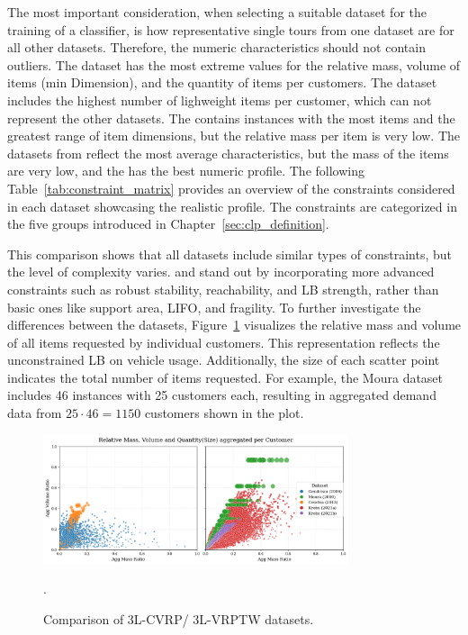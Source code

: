The most important consideration, when selecting a suitable dataset for the training of a classifier,
is how representative single tours from one dataset are for all other datasets. Therefore, the numeric characteristics
should not contain outliers. The \gendreauDataSetText dataset has the most extreme values for the relative mass, volume of items (min Dimension),
and the quantity of items per customers. The \mouraDataSetText dataset includes the highest number of lighweight items per customer,
which can not represent the other datasets. The \ceschiaDataSetText contains instances with the most items and the greatest range
of item dimensions, but the relative mass per item is very low. The datasets from \citeauthor*{krebs_advanced_2021}
reflect the most average characteristics, but the mass of the \krebsBDataSetText items are very low, and the \krebsADataSetText
has the best numeric profile. The following Table~\ref{tab:constraint_matrix} provides an overview of the constraints considered
in each dataset showcasing the realistic profile. The constraints are categorized in the five groups introduced
in Chapter~\ref{sec:clp_definition}.



This comparison shows that all datasets include similar types of constraints, but the level
of complexity varies. \krebsADataSetText and \ceschiaDataSetText stand out by incorporating
more advanced constraints such as robust stability, reachability, and LB strength, rather than
basic ones like support area, \gls{LIFO}, and fragility. To further investigate the differences
between the datasets, Figure~\ref{fig:dataset_comparison} visualizes the relative mass and
volume of all items requested by individual customers. This representation reflects the
unconstrained \gls{LB} on vehicle usage. Additionally, the size of each scatter point indicates
the total number of items requested. For example, the Moura dataset includes 46 instances with 25
customers each, resulting in aggregated demand data from $25 \cdot 46 = 1150$ customers shown in
the plot.

\begin{figure}[ht]
    \centering
    \includegraphics[width=0.8\textwidth]{pictures/comparison_datasets_3lcvrp.png}
    \caption{Comparison of 3L-CVRP/ 3L-VRPTW datasets.}.
    \label{fig:dataset_comparison}
\end{figure}

